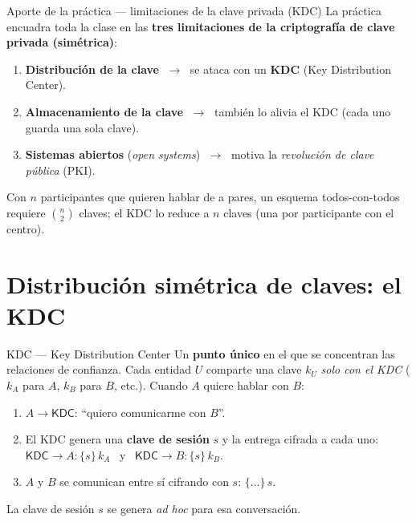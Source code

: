 \documentclass[11pt,a4paper]{article}
\newcommand{\enc}[2]{\{#1\}\,#2}          %
\newcommand{\kdc}{\textsf{KDC}}
\begin{document}
\begin{practbox}{Aporte de la práctica — limitaciones de la clave privada (KDC)}
La práctica encuadra toda la clase en las \textbf{tres limitaciones de la criptografía de
clave privada (simétrica)}:
\begin{enumerate}[leftmargin=1.6em,itemsep=1pt]
  \item \textbf{Distribución de la clave} $\;\to\;$ se ataca con un \textbf{KDC} (Key
        Distribution Center).
  \item \textbf{Almacenamiento de la clave} $\;\to\;$ también lo alivia el KDC (cada uno
        guarda una sola clave).
  \item \textbf{Sistemas abiertos} (\emph{open systems}) $\;\to\;$ motiva la
        \emph{revolución de clave pública} (PKI).
\end{enumerate}
Con $n$ participantes que quieren hablar de a pares, un esquema todos-con-todos requiere
$\binom{n}{2}$ claves; el KDC lo reduce a $n$ claves (una por participante con el centro).
\end{practbox}

\section{Distribución simétrica de claves: el KDC}

\begin{defbox}{KDC — Key Distribution Center}
Un \textbf{punto único} en el que se concentran las relaciones de confianza. Cada entidad
$U$ comparte una clave $k_U$ \emph{solo con el KDC} ($k_A$ para $A$, $k_B$ para $B$, etc.).
Cuando $A$ quiere hablar con $B$:
\begin{enumerate}[leftmargin=1.6em,itemsep=1pt]
  \item $A \to \kdc$: ``quiero comunicarme con $B$''.
  \item El \kdc{} genera una \textbf{clave de sesión} $s$ y la entrega cifrada a cada uno:
        $\kdc \to A:\enc{s}{k_A}$ \ y \ $\kdc \to B:\enc{s}{k_B}$.
  \item $A$ y $B$ se comunican entre sí cifrando con $s$: $\enc{\dots}{s}$.
\end{enumerate}
La clave de sesión $s$ se genera \emph{ad hoc} para esa conversación.
\end{defbox}
\end{document}
